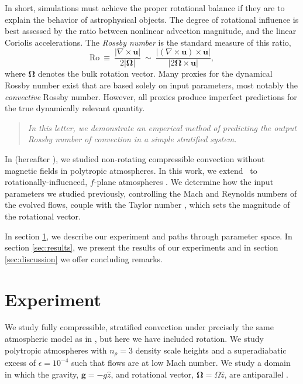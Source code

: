 \documentclass[twocolumn, amsmath, amsfonts, amssymb]{aastex62}
\begin{document}
In short, simulations must achieve the proper rotational balance if they are to explain 
the behavior of astrophysical objects. 
The degree of rotational influence is best assessed by the ratio between 
nonlinear advection magnitude, and the linear Coriolis accelerations. 
The \textit{Rossby number} is the standard measure of this ratio, 
\begin{equation}
\text{Ro} \ \equiv \ \frac{| \nabla \times \boldsymbol{u} | }{2 |\bm{\Omega}|} \ 
\sim \ \frac{| (\nabla \times \boldsymbol{u}) \times \boldsymbol{u}  | }{|2 \bm{\Omega} \times \boldsymbol{u}|},
\label{eqn:rossby-def}
\end{equation}
where $\bm{\Omega}$ denotes the bulk rotation vector. 
Many proxies for the dynamical Rossby number exist that are based solely on input parameters, most notably the \textit{convective} Rossby number. 
However, all proxies produce imperfect predictions for the true dynamically relevant quantity.
\begin{quote}
\emph{In this letter, we demonstrate an emperical method of predicting the output Rossby number
of convection in a simple stratified system.}
\end{quote}
In \cite{anders&brown2017} (hereafter \AB), we studied non-rotating compressible convection without magnetic fields in polytropic atmospheres. 
In this work, we extend \AB$\,$ to rotationally-influenced, $f$-plane
atmospheres 
\cite[e.g.][]{brummell&all1996, brummell&all1998, calkins&all2015a}. 
We determine how the input parameters we studied previously, controlling the Mach and
Reynolds numbers of the evolved flows, couple with the Taylor number \citep[Ta, ][]{julien&all1996}, which sets the magnitude of the rotational vector. 

In section  \ref{sec:experiment}, we describe our experiment and paths through parameter space. 
In section \ref{sec:results}, we present the results of our experiments and in section \ref{sec:discussion} we offer concluding remarks.

\section{Experiment} 
\label{sec:experiment}
We study fully compressible, stratified 
convection under precisely the same atmospheric model
as in \AB, but here
we have included rotation. We study polytropic atmospheres
with $n_\rho = 3$ density scale heights and a superadiabatic
excess of $\epsilon = 10^{-4}$ such that flows are at low Mach number.
We study a domain in which the
gravity, $\bm{g} = -g\hat{z}$, and rotational vector, $\bm{\Omega} = \Omega \hat{z}$, 
are antiparallel \citep[as in e.g.,][]{julien&all1996, brummell&all1996}.
\end{document}
